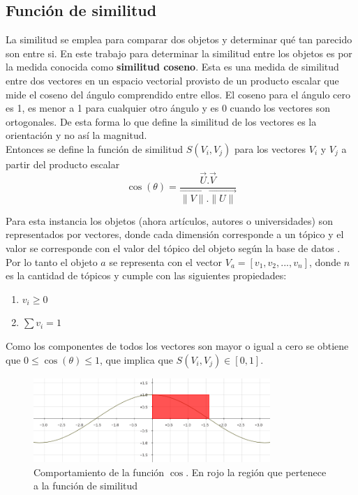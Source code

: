 \subsection{Función de similitud}
La similitud se emplea para comparar dos objetos y determinar qué tan parecido son entre si. En este trabajo para determinar la similitud entre los objetos es por la medida conocida como \textbf{similitud coseno}. Esta es una medida de similitud entre dos vectores en un espacio vectorial provisto de un producto escalar que mide el coseno del ángulo comprendido entre ellos. El coseno para el ángulo cero es 1, es menor a 1 para cualquier otro ángulo y es 0 cuando los vectores son ortogonales. De esta forma lo que define la similitud de los vectores es la orientación y no así la magnitud.\\
Entonces se define la función de similitud $S(V_i, V_j)$ para los vectores $V_i$ y $V_j$ a partir del producto escalar\\

\begin{equation} \label{eq:angulovectorial}
\cos(\theta) =  \dfrac{\overrightarrow{U} . \overrightarrow{V}}{\overrightarrow{\lVert V\lVert}.\overrightarrow{\lVert U\lVert}}
\end{equation}

Para esta instancia los objetos (ahora artículos, autores o universidades) son representados por vectores, donde cada dimensión corresponde a un tópico y el valor se corresponde con el valor del tópico del objeto según la base de datos \cite{dataDrive}. Por lo tanto el objeto $a$ se representa con el vector $V_a = [v_1,v_2,...,v_n]$, donde $n$ es la cantidad de tópicos y cumple con las siguientes propiedades:
\begin{enumerate}
 \item $v_i \geq 0$
 \item $\sum{v_i} = 1$
\end{enumerate}

Como los componentes de todos los vectores son mayor o igual a cero se obtiene que $0\leq\cos(\theta)\leq1$, que implica que $S(V_i, V_j) \in \left[0, 1\right]$.\\

\begin{figure}[H]
\includegraphics[width=0.8\textwidth]{img/coseno.png}
\caption{Comportamiento de la función $\cos$. En rojo la región que pertenece a la función de similitud}
\label{bus:img-coseno}
\end{figure}

